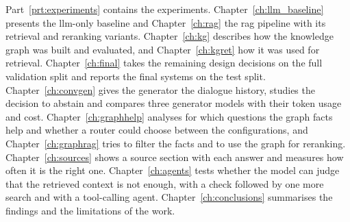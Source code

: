 Part~\ref{prt:experiments} contains the experiments. Chapter~\ref{ch:llm_baseline}
presents the \gls{llm}-only baseline and Chapter~\ref{ch:rag} the \gls{rag} pipeline
with its retrieval and reranking variants. Chapter~\ref{ch:kg} describes how the
knowledge graph was built and evaluated, and Chapter~\ref{ch:kgret} how it was used for
retrieval. Chapter~\ref{ch:final} takes the remaining design decisions on the full
validation split and reports the final systems on the test split. Chapter~\ref{ch:convgen}
gives the generator the dialogue history, studies the decision to abstain and compares
three generator models with their token usage and cost. Chapter~\ref{ch:graphhelp} analyses
for which questions the graph facts help and whether a router could choose between the
configurations, and Chapter~\ref{ch:graphrag} tries to filter the facts and to use the graph
for reranking. Chapter~\ref{ch:sources} shows a source section with each answer and measures how
often it is the right one. Chapter~\ref{ch:agents} tests whether the model can judge that the
retrieved context is not enough, with a check followed by one more search and with a tool-calling agent.
Chapter~\ref{ch:conclusions} summarises the findings and the limitations of the work.
